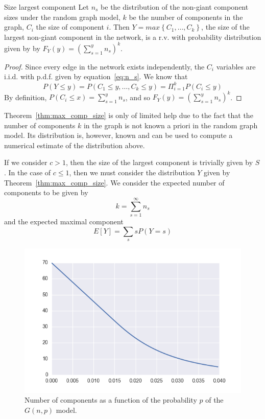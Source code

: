 \begin{theorem}{Size largest component}
\label{thm:max_comp_size}
Let $n_s$ be the distribution of the non-giant component sizes under the random graph model, $k$ be the number of components in the graph, $C_i$ the size of component $i$.
Then $Y=max\left\{ C_1,\ldots,C_k\right\}$, the size of the largest non-giant component in the network, is a r.v. with probability distribution given by
by $F_Y(y) = (\sum_{s=1}^{y} n_s)^k$.
\end{theorem}
\begin{proof}
Since every edge in the network exists independently, the $C_i$ variables are i.i.d. with p.d.f. given by equation~\ref{eq:n_s}.
We know that 
$$P(Y\le y) = P (C_1 \le y, \ldots , C_k \le y) = \Pi_{i=1}^{k} P(C_i \le y)$$
By definition, $P(C_i \le x) = \sum_{s=1}^y n_s$, and so $F_Y(y) = \left( \sum_{s=1}^y n_s \right)^k$.
\end{proof}
\vspace{0.3cm}
\begin{remark}
Theorem~\vref{thm:max_comp_size} is only of limited help due to the fact that the number of components $k$ in the graph is not known a priori in the random graph model.
Its distribution is, however, known and can be used to compute a numerical estimate of the distribution above.
\end{remark}



If we consider $c > 1$, then the size of the largest component is trivially given by $S$.
In the case of $c \le 1$, then we must consider the distribution $Y$ given by Theorem~\ref{thm:max_comp_size}.
We consider the expected number of components to be given by
\begin{equation}
	k = \sum_{s=1}^{\infty} n_s
\end{equation}
and the expected maximal component
\begin{equation}
	E[Y] = \sum_s s P(Y=s)
\end{equation}



\begin{figure}[tb]
	\centering
	\includegraphics[scale=0.8]{figures/gnp_number_components.png}
	\caption{Number of components as a function of the probability $p$ of the $G(n,p)$ model.}
	\label{fig:gnp_number_components}
\end{figure}


